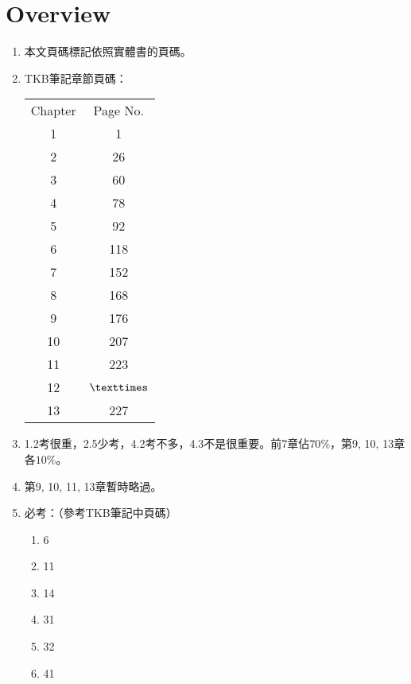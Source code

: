 \section{Overview}

\begin{enumerate}
    \item 本文頁碼標記依照實體書\cite{1}\cite{2}\cite{3}的頁碼。
    \item TKB筆記\cite{4}章節頁碼：
    \begin{table}[H]
        \centering
        \begin{tabular}{|c|c|}
            \hline
            Chapter & Page No. \\
            \Xhline{2\arrayrulewidth}
            1 & 1 \\
            \hline
            2 & 26 \\
            \hline
            3 & 60 \\
            \hline
            4 & 78 \\
            \hline
            5 & 92 \\
            \hline
            6 & 118 \\
            \hline
            7 & 152 \\
            \hline
            8 & 168 \\
            \hline
            9 & 176 \\
            \hline
            10 & 207 \\
            \hline
            11 & 223 \\
            \hline
            12 & $\texttimes$ \\
            \hline
            13 & 227 \\
            \hline
        \end{tabular}
    \end{table}
    \item 1.2考很重，2.5少考，4.2考不多，4.3不是很重要。前7章佔$70\%$，第9, 10, 13章各$10\%$。
    \item 第9, 10, 11, 13章暫時略過。
    \item 必考：（參考TKB筆記\cite{4}中頁碼）
    \begin{enumerate}
        \item 6
        \item 11
        \item 14
        \item 31
        \item 32
        \item 41

\end{enumerate}
\end{enumerate}
